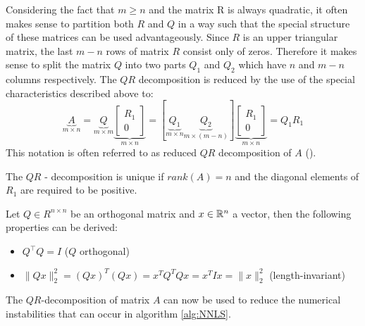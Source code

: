 Considering the fact that $m \geq n$ and the matrix R is always quadratic, it often makes sense to partition both $R$ and $Q$ in a way such that the special structure of these matrices can be used advantageously. Since $R$ is an upper triangular matrix, the last $m-n$ rows of matrix $R$ consist only of zeros. Therefore it makes sense to split the matrix $Q$ into two parts $Q_1$ and $Q_2$ which have $n$ and $m-n$ columns respectively. The $QR$ decomposition is reduced by the use of the special characteristics described above to:
\begin{equation}\label{equ:thin_QR}
	\underbrace{A}_{m \times n} =  \underbrace{Q}_{m \times m} \underbrace{\begin{bmatrix} R_1 \\ 0 \end{bmatrix}}_{m \times n} = [\underbrace{Q_1}_{m \times n} \underbrace{Q_2}_{m \times (m-n)} ]  \underbrace{\begin{bmatrix} R_1 \\ 0 \end{bmatrix}}_{m \times n} = Q_1 R_1
\end{equation}
This notation is often referred to as reduced $QR$ decomposition of $A$ (\cite{trefethen1997numerical}).

\begin{remark} The $QR$ - decomposition is unique if $rank(A) = n$ and the diagonal elements of $R_1$ are required to be positive.
\end{remark}

\begin{remark} Let $Q \in R^{n \times n}$ be an orthogonal matrix and $x \in \mathbb{R}^n$ a vector, then the following properties can be derived:
	\begin{itemize}
		\item $Q^\top Q = I$ \hfill ($Q$ orthogonal)
		\item $\lVert Qx \rVert_2^2 = (Qx)^T (Qx) = x^T Q^T Q x = x^T I x = \lVert x \rVert_2^2$ \hfill (length-invariant)

	\end{itemize}
\end{remark}

The $QR$-decomposition of matrix $A$ can now be used to reduce the numerical instabilities that can occur in algorithm \ref{alg:NNLS}. 

